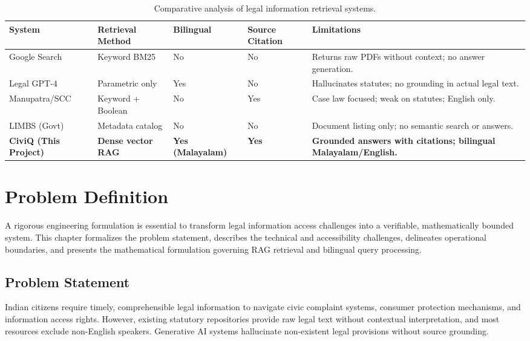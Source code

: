 \documentclass[12pt,a4paper]{report}
\begin{document}
\begin{table}[H]
\centering
\begin{singlespace}
\caption{Comparative analysis of legal information retrieval systems.}
\label{tab:lit_comparison}
\footnotesize
\renewcommand{\arraystretch}{1.1}
\begin{tabularx}{\textwidth}{>{\raggedright\arraybackslash}p{2.8cm} >{\centering\arraybackslash}p{1.8cm} >{\centering\arraybackslash}p{1.5cm} >{\centering\arraybackslash}p{1.8cm} >{\raggedright\arraybackslash}X}
\toprule
\textbf{System} & \textbf{Retrieval Method} & \textbf{Bilingual} & \textbf{Source Citation} & \textbf{Limitations} \\
\midrule
Google Search & Keyword BM25 & No & No & Returns raw PDFs without context; no answer generation. \\
Legal GPT-4 & Parametric only & Yes & No & Hallucinates statutes; no grounding in actual legal text. \\
Manupatra/SCC & Keyword + Boolean & No & Yes & Case law focused; weak on statutes; English only. \\
LIMBS (Govt) & Metadata catalog & No & No & Document listing only; no semantic search or answers. \\
\textbf{CiviQ (This Project)} & \textbf{Dense vector RAG} & \textbf{Yes (Malayalam)} & \textbf{Yes} & \textbf{Grounded answers with citations; bilingual Malayalam/English.} \\
\bottomrule
\end{tabularx}
\end{singlespace}
\end{table}



\chapter{Problem Definition}

A rigorous engineering formulation is essential to transform legal information access challenges into a verifiable, mathematically bounded system. This chapter formalizes the problem statement, describes the technical and accessibility challenges, delineates operational boundaries, and presents the mathematical formulation governing RAG retrieval and bilingual query processing.

\section{Problem Statement}
Indian citizens require timely, comprehensible legal information to navigate civic complaint systems, consumer protection mechanisms, and information access rights. However, existing statutory repositories provide raw legal text without contextual interpretation, and most resources exclude non-English speakers. Generative AI systems hallucinate non-existent legal provisions without source grounding.
\end{document}
